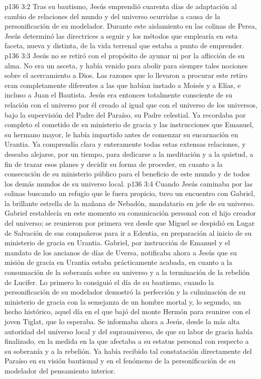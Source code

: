 \vs p136 3:2 Tras su bautismo, Jesús emprendió cuarenta días de adaptación al cambio de relaciones del mundo y del universo ocurridas a causa de la personificación de su modelador. Durante este aislamiento en las colinas de Perea, Jesús determinó las directrices a seguir y los métodos que emplearía en esta faceta, nueva y distinta, de la vida terrenal que estaba a punto de emprender.
\vs p136 3:3 Jesús no se retiró con el propósito de ayunar ni por la aflicción de su alma. No era un asceta, y había venido para abolir para siempre tales nociones sobre el acercamiento a Dios. Las razones que lo llevaron a procurar este retiro eran completamente diferentes a las que habían instado a Moisés y a Elías, e incluso a Juan el Bautista. Jesús era entonces totalmente consciente de su relación con el universo por él creado al igual que con el universo de los universos, bajo la supervisión del Padre del Paraíso, su Padre celestial. Ya recordaba por completo el cometido de su ministerio de gracia y las instrucciones que Emanuel, su hermano mayor, le había impartido antes de comenzar su encarnación en Urantia. Ya comprendía clara y enteramente todas estas extensas relaciones, y deseaba alejarse, por un tiempo, para dedicarse a la meditación y a la quietud, a fin de trazar esos planes y decidir su forma de proceder, en cuanto a la consecución de su ministerio público para el beneficio de este mundo y de todos los demás mundos de su universo local.
\vs p136 3:4 \pc Cuando Jesús caminaba por las colinas buscando un refugio que le fuera propicio, tuvo un encuentro con Gabriel, la brillante estrella de la mañana de Nebadón, mandatario en jefe de su universo. Gabriel restablecía en este momento su comunicación personal con el hijo creador del universo; se reunieron por primera vez desde que Miguel se despidió en Lugar de Salvación de sus compañeros para ir a Edentia, en preparación al inicio de su ministerio de gracia en Urantia. Gabriel, por instrucción de Emanuel y el mandato de los ancianos de días de Uversa, notificaba ahora a Jesús que su misión de gracia en Urantia estaba prácticamente acabada, en cuanto a la consumación de la soberanía sobre su universo y a la terminación de la rebelión de Lucifer. Lo primero lo consiguió el día de su bautismo, cuando la personificación de su modelador demostró la perfección y la culminación de su ministerio de gracia con la semejanza de un hombre mortal y, lo segundo, un hecho histórico, aquel día en el que bajó del monte Hermón para reunirse con el joven Tiglat, que lo esperaba. Se informaba ahora a Jesús, desde la más alta autoridad del universo local y del suprauniverso, de que su labor de gracia había finalizado, en la medida en la que afectaba a su estatus personal con respecto a su soberanía y a la rebelión. Ya había recibido tal constatación directamente del Paraíso en su visión bautismal y en el fenómeno de la personificación de su modelador del pensamiento interior.
